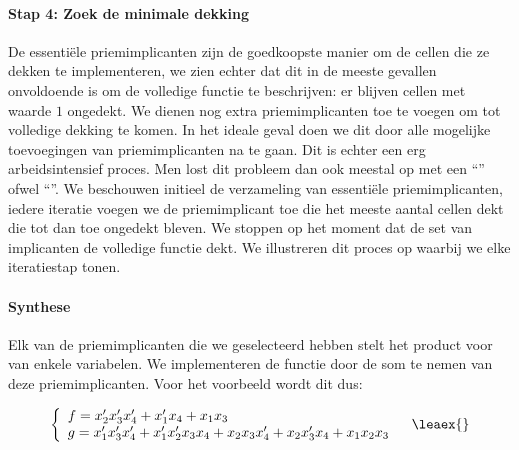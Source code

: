 
\paragraph{Stap 4: Zoek de minimale dekking}
De essenti\"ele priemimplicanten zijn de goedkoopste manier om de cellen die ze dekken te implementeren, we zien echter dat dit in de meeste gevallen onvoldoende is om de volledige functie te beschrijven: er blijven cellen met waarde $1$ ongedekt. We dienen nog extra priemimplicanten toe te voegen om tot volledige dekking te komen. In het ideale geval doen we dit door alle mogelijke toevoegingen van priemimplicanten na te gaan. Dit is echter een erg arbeidsintensief proces. Men lost dit probleem dan ook meestal op met een ``'' ofwel ``''. We beschouwen initieel de verzameling van essenti\"ele priemimplicanten, iedere iteratie voegen we de priemimplicant toe die het meeste aantal cellen dekt die tot dan toe ongedekt bleven. We stoppen op het moment dat de set van implicanten de volledige functie dekt. We illustreren dit proces op  waarbij we elke iteratiestap tonen.


\paragraph{Synthese}
Elk van de priemimplicanten die we geselecteerd hebben stelt het product voor van enkele variabelen. We implementeren de functie door de som te nemen van deze priemimplicanten. Voor het voorbeeld wordt dit dus:

\begin{equation}
\begin{array}{ll}
\acclguard{
f=x_2'x_3'x_4'+x_1'x_4+x_1x_3\\
g=x_1'x_3'x_4'+x_1'x_2'x_3x_4+x_2x_3x_4'+x_2x_3'x_4+x_1x_2x_3
}&\leaex{}
\end{array}
\end{equation}

